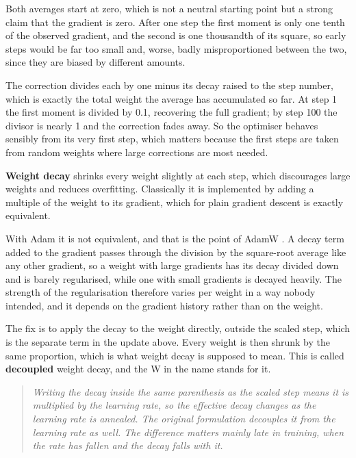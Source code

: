 Both averages start at zero, which is not a neutral starting point but a strong claim that the gradient is zero. After one step the first moment is only one tenth of the observed gradient, and the second is one thousandth of its square, so early steps would be far too small and, worse, badly misproportioned between the two, since they are biased by different amounts.

The correction divides each by one minus its decay raised to the step number, which is exactly the total weight the average has accumulated so far. At step 1 the first moment is divided by 0.1, recovering the full gradient; by step 100 the divisor is nearly 1 and the correction fades away. So the optimiser behaves sensibly from its very first step, which matters because the first steps are taken from random weights where large corrections are most needed.


\textbf{Weight decay} shrinks every weight slightly at each step, which discourages large weights and reduces overfitting. Classically it is implemented by adding a multiple of the weight to its gradient, which for plain gradient descent is exactly equivalent.

With Adam it is not equivalent, and that is the point of AdamW \cite{loshchilov2019}. A decay term added to the gradient passes through the division by the square-root average like any other gradient, so a weight with large gradients has its decay divided down and is barely regularised, while one with small gradients is decayed heavily. The strength of the regularisation therefore varies per weight in a way nobody intended, and it depends on the gradient history rather than on the weight.

The fix is to apply the decay to the weight directly, outside the scaled step, which is the separate term in the update above. Every weight is then shrunk by the same proportion, which is what weight decay is supposed to mean. This is called \textbf{decoupled} weight decay, and the W in the name stands for it.


\begin{quote}\small\itshape Writing the decay inside the same parenthesis as the scaled step means it is multiplied by the learning rate, so the effective decay changes as the learning rate is annealed. The original formulation decouples it from the learning rate as well. The difference matters mainly late in training, when the rate has fallen and the decay falls with it.\end{quote}


